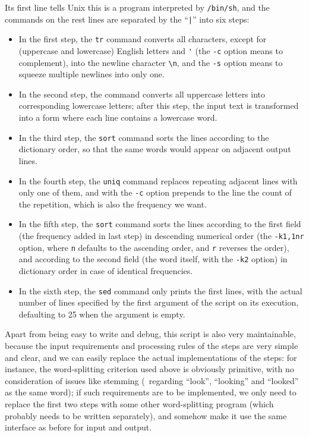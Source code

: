 Its first line tells Unix this is a program interpreted by \verb|/bin/sh|,
and the commands on the rest lines are separated by the
 ``\verb/|/'' into six steps:
\begin{itemize}
\item In the first step, the \verb|tr| command converts all characters, except
	for (uppercase and lowercase) English letters and \verb|'| (the \verb|-c|
	option means to complement), into the newline character \verb|\n|, and
	the \verb|-s| option means to squeeze multiple newlines into only one.
\item In the second step, the command converts all uppercase letters into
	corresponding lowercase letters; after this step, the input text is
	transformed into a form where each line contains a lowercase word.
\item In the third step, the \verb|sort| command sorts the lines according
	to the dictionary order, so that the same words would appear on
	adjacent output lines.
\item In the fourth step, the \verb|uniq| command replaces repeating adjacent
	lines with only one of them, and with the \verb|-c| option prepends to the
	line the count of the repetition, which is also the frequency we want.
\item In the fifth step, the \verb|sort| command sorts the lines according to
	the first field (the frequency added in last step) in descending numerical
	order (the \verb|-k1,1nr| option, where \verb|n| defaults to the
	ascending order, and \verb|r| reverses the order), and according
	to the second field (the word itself, with the \verb|-k2| option)
	in dictionary order in case of identical frequencies.
\item In the sixth step, the \verb|sed| command only prints the first lines,
	with the actual number of lines specified by the first argument of the
	script on its execution, defaulting to 25 when the argument is empty.
\end{itemize}
Apart from being easy to write and debug, this script is also very maintainable,
because the input requirements and processing rules of the steps are very simple
and clear, and we can easily replace the actual implementations of the steps:
for instance, the word-splitting criterion used above is obviously primitive,
with no consideration of issues like stemming (\eg~regarding ``look'',
``looking'' and ``looked'' as the same word); if such requirements are to
be implemented, we only need to replace the first two steps with some other
word-splitting program (which probably needs to be written separately), and
somehow make it use the same interface as before for input and output.

